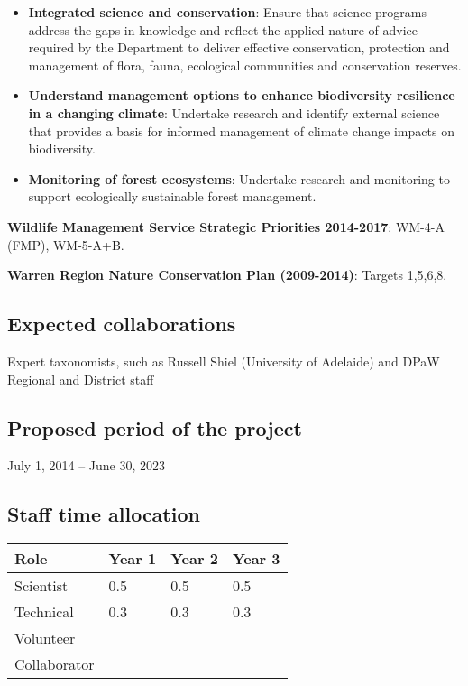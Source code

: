 \documentclass[version=last, paper=a4, DIV=18, usenames, dvipsnames]{scrartcl}
\begin{document}
\begin{itemize}
\item
  \textbf{Integrated science and conservation}: Ensure that science
  programs address the gaps in knowledge and reflect the applied nature
  of advice required by the Department to deliver effective
  conservation, protection and management of flora, fauna, ecological
  communities and conservation reserves.
\item
  \textbf{Understand management options to enhance biodiversity
  resilience in a changing climate}: Undertake research and identify
  external science that provides a basis for informed management of
  climate change impacts on biodiversity.
\item
  \textbf{Monitoring of forest ecosystems}: Undertake research and
  monitoring to support ecologically sustainable forest management.
\end{itemize}

\textbf{Wildlife Management Service Strategic Priorities 2014-2017}:
WM-4-A (FMP), WM-5-A+B.

\textbf{Warren Region Nature Conservation Plan (2009-2014)}: Targets
1,5,6,8.



\subsection*{Expected collaborations}
Expert taxonomists, such as Russell Shiel (University of Adelaide) and
DPaW Regional and District staff


\subsection*{Proposed period of the project}
July 1, 2014 -- June 30, 2023

\subsection*{Staff time allocation }



\begin{longtabu} to \linewidth { |  X | X | X | X | }
\hline
{}
Role & Year 1 & Year 2 & Year 3\\
\hline
\endhead



Scientist & 0.5 & 0.5 & 0.5\\



Technical & 0.3 & 0.3 & 0.3\\



Volunteer &  &  & \\



Collaborator &  &  & \\


\hline
\end{longtabu}
\end{document}
